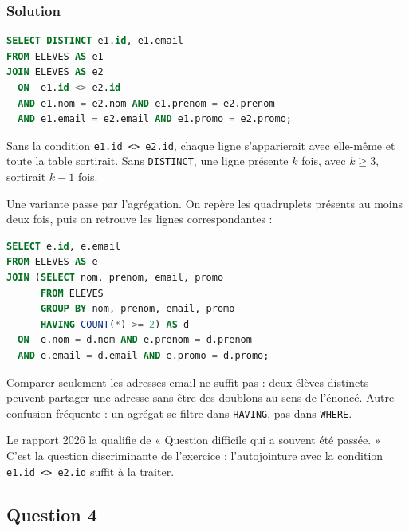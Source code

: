 \documentclass[11pt,a4paper]{article}
\begin{document}
\hypertarget{solution-2}{%
\subsubsection{Solution}\label{solution-2}}

\begin{lstlisting}[language=SQL]
SELECT DISTINCT e1.id, e1.email
FROM ELEVES AS e1
JOIN ELEVES AS e2
  ON  e1.id <> e2.id
  AND e1.nom = e2.nom AND e1.prenom = e2.prenom
  AND e1.email = e2.email AND e1.promo = e2.promo;
\end{lstlisting}

Sans la condition \texttt{e1.id\ \textless{}\textgreater{}\ e2.id}, chaque ligne s'apparierait avec elle-même et toute la table sortirait. Sans \texttt{DISTINCT}, une ligne présente \(k\) fois, avec \(k\ge3\), sortirait \(k-1\) fois.

Une variante passe par l'agrégation. On repère les quadruplets présents au moins deux fois, puis on retrouve les lignes correspondantes :

\begin{lstlisting}[language=SQL]
SELECT e.id, e.email
FROM ELEVES AS e
JOIN (SELECT nom, prenom, email, promo
      FROM ELEVES
      GROUP BY nom, prenom, email, promo
      HAVING COUNT(*) >= 2) AS d
  ON  e.nom = d.nom AND e.prenom = d.prenom
  AND e.email = d.email AND e.promo = d.promo;
\end{lstlisting}

\begin{piege}

Comparer seulement les adresses email ne suffit pas : deux élèves distincts peuvent partager une adresse sans être des doublons au sens de l'énoncé. Autre confusion fréquente : un agrégat se filtre dans \texttt{HAVING}, pas dans \texttt{WHERE}.

\end{piege}

\begin{jury}

Le rapport 2026 la qualifie de « Question difficile qui a souvent été passée. » C'est la question discriminante de l'exercice : l'autojointure avec la condition \texttt{e1.id\ \textless{}\textgreater{}\ e2.id} suffit à la traiter.

\end{jury}

\hypertarget{question-4}{%
\subsection{Question 4}\label{question-4}}
\end{document}

